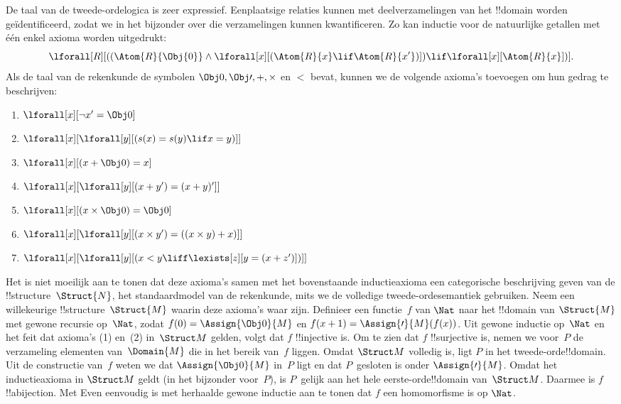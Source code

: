 \documentclass[openany]{memoir}
\begin{document}
De taal van de tweede-ordelogica is zeer expressief. Eenplaatsige relaties
kunnen met deelverzamelingen van het !!{domain} worden geïdentificeerd, zodat
we in het bijzonder over die verzamelingen kunnen kwantificeren. Zo kan
inductie voor de natuurlijke getallen met één enkel axioma worden uitgedrukt:
\[
\lforall[R][((\Atom{R}{\Obj{0}} \land \lforall[x][(\Atom{R}{x} \lif
    \Atom{R}{x'})]) \lif \lforall[x][\Atom{R}{x}])].
\]
Als de taal van de rekenkunde de symbolen $\Obj 0, \Obj \prime, +,
\times$ en $<$ bevat, kunnen we de volgende axioma's toevoegen om hun gedrag
te beschrijven:
\begin{enumerate}
\item $\lforall[x][\lnot x' = \Obj 0]$
\item $\lforall[x][\lforall[y][(s(x) = s(y) \lif x = y)]]$
\item $\lforall[x][(x + \Obj 0) = x]$
\item $\lforall[x][\lforall[y][(x + y') = (x + y)']]$
\item $\lforall[x][(x \times \Obj 0) = \Obj 0]$
\item $\lforall[x][\lforall[y][(x \times y') = ((x \times y) + x)]]$
\item $\lforall[x][\lforall[y][(x < y \liff \lexists[z][y = (x + z')])]]$
\end{enumerate}
Het is niet moeilijk aan te tonen dat deze axioma's samen met het bovenstaande
inductieaxioma een categorische beschrijving geven van de
!!{structure}~$\Struct{N}$, het standaardmodel van de rekenkunde, mits we de
volledige tweede-ordesemantiek gebruiken. Neem een willekeurige
!!{structure}~$\Struct{M}$ waarin deze axioma's waar zijn. Definieer een
functie~$f$ van $\Nat$ naar het !!{domain} van $\Struct{M}$ met gewone
recursie op~$\Nat$, zodat $f(0) = \Assign{\Obj 0}{M}$ en
$f(x+1) = \Assign{\prime}{M}(f(x))$. Uit gewone inductie op~$\Nat$ en het
feit dat axioma's (1) en~(2) in~$\Struct M$ gelden, volgt dat $f$
!!{injective} is. Om te zien dat $f$ !!{surjective} is, nemen we voor~$P$ de
verzameling elementen van~$\Domain{M}$ die in het bereik van~$f$ liggen.
Omdat $\Struct M$ volledig is, ligt $P$ in het tweede-orde!!{domain}. Uit de
constructie van~$f$ weten we dat $\Assign{\Obj 0}{M}$ in~$P$ ligt en dat
$P$~gesloten is onder $\Assign{\prime}{M}$. Omdat het inductieaxioma in
$\Struct M$ geldt (in het bijzonder voor~$P$), is $P$~gelijk aan het hele
eerste-orde!!{domain} van~$\Struct M$. Daarmee is $f$ !!a{bijection}. Met
Even eenvoudig is met herhaalde gewone inductie aan te tonen dat $f$ een
homomorfisme is op $\Nat$.
\end{document}
